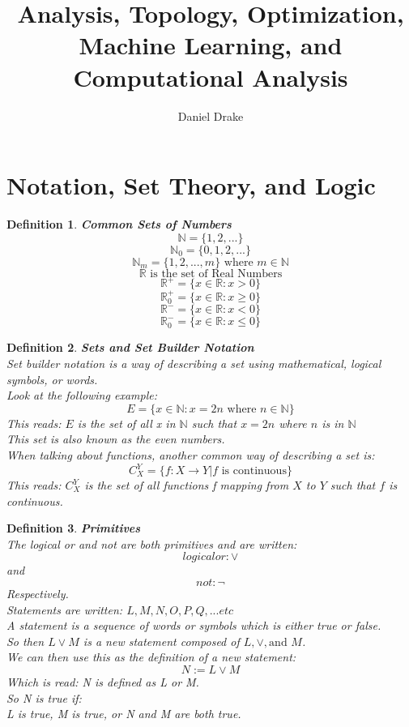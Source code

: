 \documentclass[12pt]{extarticle}
\title{Analysis, Topology, Optimization, Machine Learning, and Computational Analysis}
\author{Daniel Drake}
\theoremstyle{plain}
\theoremstyle{plain}
\theoremstyle{Definition}
\newtheorem{def.}{Definition}[section]
\theoremstyle{Definition}
\theoremstyle{plain}
\begin{document}
\maketitle			
\section{Notation, Set Theory, and Logic}
\begin{def.} \textbf{Common Sets of Numbers} \\ 
	$$\mathbb{N} = \{1,2,...\}$$	
	$$\mathbb{N}_0 = \{0,1,2,...\}$$
	$$\mathbb{N}_m = \{1,2,...,m\} \text{ where } m \in \mathbb{N}$$
	$$\mathbb{R} \text{ is the set of Real Numbers}$$
	$$\mathbb{R}^+ = \{x \in \mathbb{R} : x > 0\}$$
	$$\mathbb{R}_0^+ = \{x \in \mathbb{R} : x \geq 0\}$$
	$$\mathbb{R}^- = \{x \in \mathbb{R} : x < 0\}$$
	$$\mathbb{R}_0^- = \{x \in \mathbb{R} : x \leq 0\}$$
\end{def.}
\begin{def.} \textbf{Sets and Set Builder Notation} \\ 
	Set builder notation is a way of describing a set using mathematical, logical symbols, or words. \\
	Look at the following example: \\ 
	$$E = \{x \in \mathbb{N}: x = 2n \text{ where } n \in \mathbb{N}\}$$
	This reads: $E$ is the set of all x in $\mathbb{N}$ such that $x = 2n$ where $n$ is in $\mathbb{N}$ \\
	This set is also known as the even numbers. \\
	When talking about functions, another common way of describing a set is: 
	$$C_X^Y = \{f : X \to Y | f \text{ is continuous} \}$$
	This reads: $C_X^Y$ is the set of all functions f mapping from $X$ to $Y$ such that $f$ is continuous. \\
\end{def.}
\begin{def.} \textbf{Primitives} \\
	The logical or and not are both primitives and are written: \\ 
	$$logical or: \lor$$ 
	and 
	$$not: \lnot$$
	Respectively. \\
	Statements are written: $L,M,N,O,P,Q,... etc$ \\
	A statement is a sequence of words or symbols which is either true or false. \\
	So then $L \lor M$ is a new statement composed of $L,\lor,\text{and } M$. \\
	We can then use this as the definition of a new statement: \\ 
	$$N := L \lor M$$
	Which is read: N is defined as L or M. \\
	So N is true if: \\ 
	L is true, M is true, or N and M are both true. \\
\end{def.}
\end{document}
